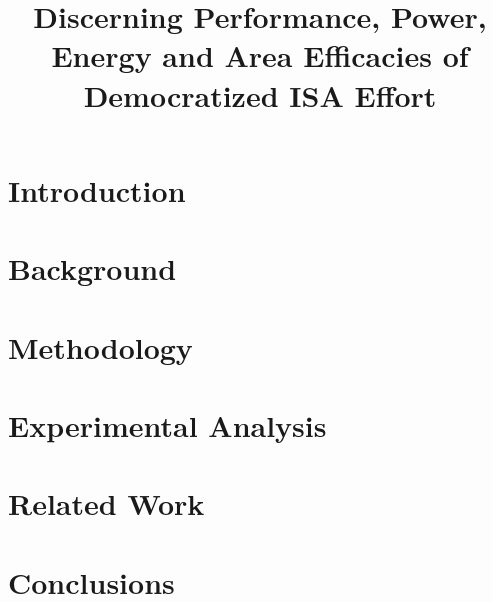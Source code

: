 \documentclass{sig-alternate}
\title{Discerning Performance, Power, Energy and Area Efficacies of Democratized ISA Effort}
\begin{document}
\maketitle
\thispagestyle{firstpage}
\pagestyle{plain}




\begin{abstract}

  

\end{abstract}

\section{Introduction}


\section{Background}


\section{Methodology}


\section{Experimental Analysis}


\section{Related Work}


\section{Conclusions}


\end{document}
